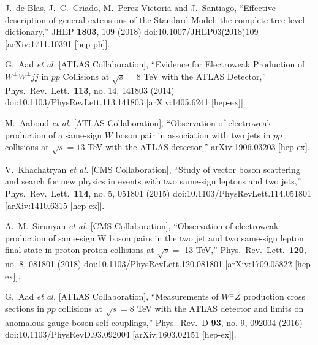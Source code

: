 \begin{thebibliography}{99}
  J.~de Blas, J.~C.~Criado, M.~Perez-Victoria and J.~Santiago,
  ``Effective description of general extensions of the Standard Model: the complete tree-level dictionary,''
  JHEP {\bf 1803}, 109 (2018)
  doi:10.1007/JHEP03(2018)109
  [arXiv:1711.10391 [hep-ph]].

  G.~Aad {\it et al.} [ATLAS Collaboration],
  ``Evidence for Electroweak Production of $W^{\pm}W^{\pm}jj$ in $pp$ Collisions at $\sqrt{s}=8$ TeV with the ATLAS Detector,''
  Phys.\ Rev.\ Lett.\  {\bf 113}, no. 14, 141803 (2014)
  doi:10.1103/PhysRevLett.113.141803
  [arXiv:1405.6241 [hep-ex]].

  M.~Aaboud {\it et al.} [ATLAS Collaboration],
  ``Observation of electroweak production of a same-sign $W$ boson pair in association with two jets in $pp$ collisions at $\sqrt{s}=13$ TeV with the ATLAS detector,''
  arXiv:1906.03203 [hep-ex].

  V.~Khachatryan {\it et al.} [CMS Collaboration],
  ``Study of vector boson scattering and search for new physics in events with two same-sign leptons and two jets,''
  Phys.\ Rev.\ Lett.\  {\bf 114}, no. 5, 051801 (2015)
  doi:10.1103/PhysRevLett.114.051801
  [arXiv:1410.6315 [hep-ex]].

  A.~M.~Sirunyan {\it et al.} [CMS Collaboration],
  ``Observation of electroweak production of same-sign W boson pairs in the two jet and two same-sign lepton final state in proton-proton collisions at $\sqrt{s} = $ 13 TeV,''
  Phys.\ Rev.\ Lett.\  {\bf 120}, no. 8, 081801 (2018)
  doi:10.1103/PhysRevLett.120.081801
  [arXiv:1709.05822 [hep-ex]].

  G.~Aad {\it et al.} [ATLAS Collaboration],
  ``Measurements of $W^\pm Z$ production cross sections in $pp$ collisions at $\sqrt{s} = 8$ TeV with the ATLAS detector and limits on anomalous gauge boson self-couplings,''
  Phys.\ Rev.\ D {\bf 93}, no. 9, 092004 (2016)
  doi:10.1103/PhysRevD.93.092004
  [arXiv:1603.02151 [hep-ex]].


\end{thebibliography}

